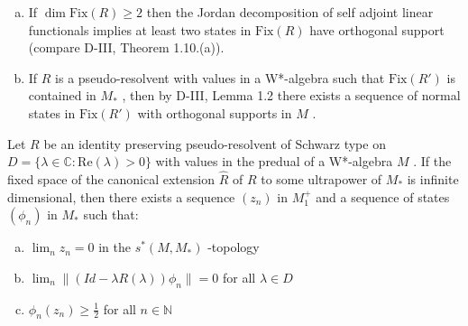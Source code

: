 \newpage

\begin{remark}\label{rem:d4-4.2}
\begin{enumerate}[(a)]
\item
If $ \dim \text{Fix}(R) \geq 2 $  then the Jordan decomposition of self adjoint linear functionals implies at least two states in $ \text{Fix}(R) $  have orthogonal support (compare D-III, Theorem 1.10.(a)).

\item
If $ R $  is a pseudo-resolvent with values in a W*-algebra such that $ \text{Fix}(R') $  is contained in $ M_{*} $ , then by D-III, Lemma 1.2 there exists a sequence of normal states in $ \text{Fix}(R') $  with orthogonal supports in $ M $ .
\end{enumerate}
\end{remark}

\begin{lemma}\label{lem:d4-4.3}
Let $ R $  be an identity preserving pseudo-resolvent of Schwarz type on $ D = \{\lambda \in \mathbb{C}: \text{Re}(\lambda) > 0\} $  with values in the predual of a W*-algebra $ M $ .
If the fixed space of the canonical extension $ \hat{R} $  of $ R $  to some ultrapower of $ M_{*} $  is infinite dimensional, then there exists a sequence $ (z_{n}) $  in $ M_{1}^{+} $  and a sequence of states $ (\phi_{n}) $  in $ M_{*} $  such that:
\begin{enumerate}[(a)]
\item
$ \lim_{n} z_{n} = 0 $  in the $ s^{*}(M,M_{*}) $ -topology

\item
$ \lim_{n} \|(Id - \lambda R(\lambda))\phi_{n}\| = 0 $  for all $ \lambda \in D $ 

\item
$ \phi_{n}(z_{n}) \geq \frac{1}{2} $  for all $ n \in \mathbb{N} $ 
\end{enumerate}
\end{lemma}

